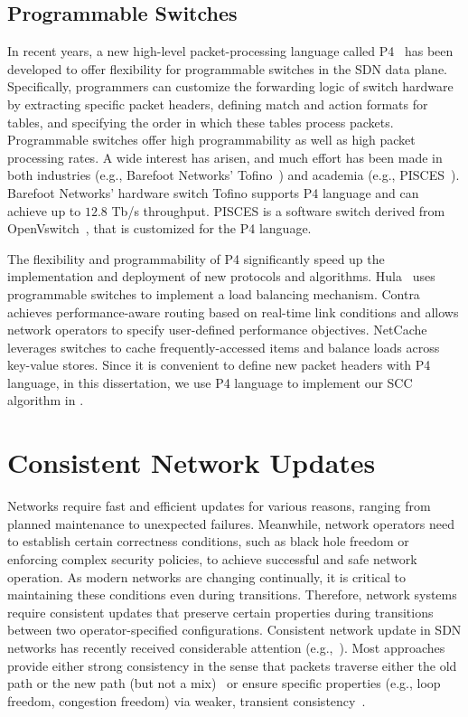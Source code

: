 \subsection{Programmable Switches}
\label{sec:sdn:progsw}
In recent years, a new high-level packet-processing language called P4~\cite{P4Switch} has been developed to offer flexibility for programmable switches in the SDN data plane. Specifically, programmers can customize the forwarding logic of switch hardware by extracting specific packet headers, defining match and action formats for tables, and specifying the order in which these tables process packets. Programmable switches offer high programmability as well as high packet processing rates. A wide interest has arisen, and much effort has been made in both industries (e.g., Barefoot Networks' Tofino~\cite{tofino}) and academia (e.g., PISCES~\cite{PISCES}).  Barefoot Networks' hardware switch Tofino supports P4 language and can achieve up to $12.8$ Tb/s throughput. PISCES is a software switch derived from OpenVswitch{~\cite{ovs}}, that is customized for the P4 language.


The flexibility and programmability of P4 significantly speed up the implementation and deployment of new protocols and algorithms. Hula{~\cite{hula}} uses programmable switches to implement a load balancing mechanism. Contra{~\cite{contra}} achieves performance-aware routing based on real-time link conditions and allows network operators to specify user-defined performance objectives. NetCache{~\cite{netcache}} leverages switches to cache frequently-accessed items and balance loads across key-value stores. Since it is convenient to define new packet headers with P4 language, in this dissertation, we use P4 language to implement our SCC algorithm in {}.


\section{Consistent Network Updates}
\label{sec:update}

Networks require fast and efficient updates for various reasons, ranging from planned maintenance to unexpected failures.  Meanwhile, network operators need to establish certain correctness conditions, such as black hole freedom or enforcing complex security policies, to achieve successful and safe network operation. As modern networks are changing continually, it is critical to maintaining these conditions even during transitions. Therefore, network systems require consistent updates that preserve certain properties during transitions between two operator-specified configurations. Consistent network update in SDN networks has recently received considerable attention (e.g.,~\cite{CU, dionysus, tsu, SynNetworkUpdate, timeflip,
  timedcu, incrementalcu, DecentralizedCU, ocusdn, ccg}). Most
approaches provide either strong consistency in the sense that packets
traverse either the old path or the new path (but not a mix)~\cite{CU,
 timedcu, incrementalcu} or ensure specific properties
(e.g., loop freedom, congestion freedom) via weaker, transient
consistency~\cite{tsu, gnu, dionysus, lfupdate, flip, dlb, swan,
zupdate}.  

